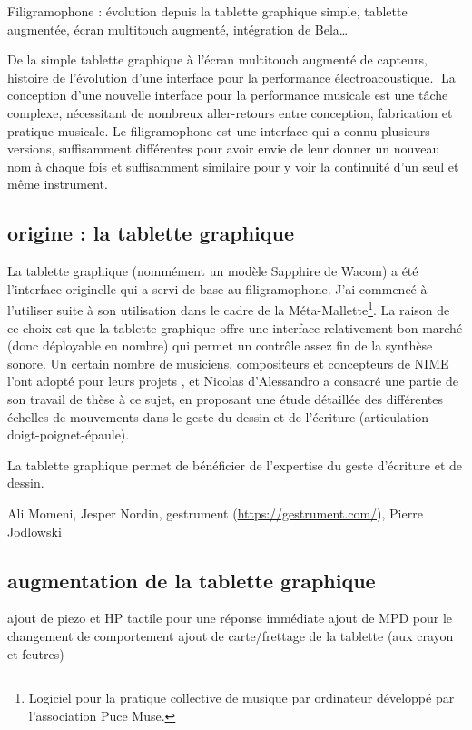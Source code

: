 Filigramophone : évolution depuis la tablette graphique simple, tablette augmentée, écran multitouch augmenté, intégration de Bela…

De la simple tablette graphique à l’écran multitouch augmenté de capteurs, histoire de l’évolution d’une interface pour la performance électroacoustique.
La conception d’une nouvelle interface pour la performance musicale est une tâche complexe, nécessitant de nombreux aller-retours entre conception, fabrication et pratique musicale. Le filigramophone est une interface qui a connu plusieurs versions, suffisamment différentes pour avoir envie de leur donner un nouveau nom à chaque fois et suffisamment similaire pour y voir la continuité d’un seul et même instrument.

\subsection{origine : la tablette graphique}
La tablette graphique (nommément un modèle Sapphire de Wacom) a été l’interface originelle qui a servi de base au filigramophone. J’ai commencé à l’utiliser suite à son utilisation dans le cadre de la Méta-Mallette\footnote{Logiciel pour la pratique collective de musique par ordinateur développé par l’association Puce Muse.}. La raison de ce choix est que la tablette graphique offre une interface relativement bon marché (donc déployable en nombre) qui permet un contrôle assez fin de la synthèse sonore.
Un certain nombre de musiciens, compositeurs et concepteurs de NIME l’ont adopté pour leurs projets \cite{zbyszynski_ten_2007}, et Nicolas d’Alessandro a consacré une partie de son travail de thèse \cite{dalessandro_realtime_2009} à ce sujet, en proposant une étude détaillée des différentes échelles de mouvements dans le geste du dessin et de l'écriture (articulation doigt-poignet-épaule).

La tablette graphique permet de bénéficier de l’expertise du geste d’écriture et de dessin.

Ali Momeni, Jesper Nordin, gestrument (\url{https://gestrument.com/}), Pierre Jodlowski


\subsection{augmentation de la tablette graphique}
ajout de piezo et HP tactile pour une réponse immédiate
ajout de MPD pour le changement de comportement
ajout de carte/frettage de la tablette (aux crayon et feutres)

